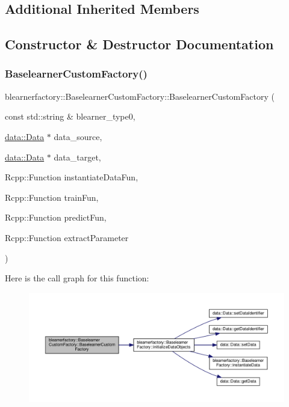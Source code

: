 \subsection*{Additional Inherited Members}


\subsection{Constructor \& Destructor Documentation}
\mbox{\label{classblearnerfactory_1_1_baselearner_custom_factory_a17a9ea35c905f9641f684db8928d3fa8}} 
\subsubsection{\texorpdfstring{Baselearner\+Custom\+Factory()}{BaselearnerCustomFactory()}}
{\footnotesize\ttfamily blearnerfactory\+::\+Baselearner\+Custom\+Factory\+::\+Baselearner\+Custom\+Factory (\begin{DoxyParamCaption}\item[{const std\+::string \&}]{blearner\+\_\+type0,  }\item[{\hyperlink{classdata_1_1_data}{data\+::\+Data} $\ast$}]{data\+\_\+source,  }\item[{\hyperlink{classdata_1_1_data}{data\+::\+Data} $\ast$}]{data\+\_\+target,  }\item[{Rcpp\+::\+Function}]{instantiate\+Data\+Fun,  }\item[{Rcpp\+::\+Function}]{train\+Fun,  }\item[{Rcpp\+::\+Function}]{predict\+Fun,  }\item[{Rcpp\+::\+Function}]{extract\+Parameter }\end{DoxyParamCaption})}

Here is the call graph for this function\+:
\nopagebreak
\begin{figure}[H]
\begin{center}
\leavevmode
\includegraphics[width=350pt]{classblearnerfactory_1_1_baselearner_custom_factory_a17a9ea35c905f9641f684db8928d3fa8_cgraph}
\end{center}
\end{figure}


